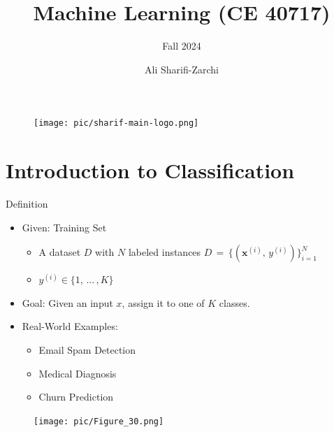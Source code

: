 \documentclass[serif, aspectratio=169]{beamer}
\author{Ali Sharifi-Zarchi}
\title{Machine Learning (CE 40717)}
\subtitle{Fall 2024}
\institute{
    CE Department \\
    Sharif University of Technology
}
\begin{document}
\begin{frame}
    \titlepage
    \vspace*{-0.6cm}
    \begin{figure}[htpb]
        \begin{center}
            \texttt{[image: pic/sharif-main-logo.png]}
        \end{center}
    \end{figure}
\end{frame}

\begin{frame}
\tableofcontents[sectionstyle=show,
subsectionstyle=show/shaded/hide,
subsubsectionstyle=show/shaded/hide]
\end{frame}

\section{Introduction to Classification}
\begin{frame}{Definition}
    \begin{itemize}\itemsep2em
        \item Given: Training Set
        \begin{itemize}
            \item A dataset \(D\) with \(N\) labeled instances \(D \, = \, \{(\mathbf{x}^{(i)}, \, y^{(i)})\}^N_{i=1}\)
            \item $y^{(i)} \in \{1, \, ... \, , K\}$
        \end{itemize}
    \end{itemize}
    \begin{itemize}
        \item \justifying Goal: Given an input $x$, assign it to one of $K$ classes.
            \item Real-World Examples:
            \begin{itemize}
                \item Email Spam Detection
                \item Medical Diagnosis
                \item Churn Prediction
            \end{itemize}
    \end{itemize}
    \endminipage
    \hfill
    \begin{figure}
            \centering
            \texttt{[image: pic/Figure\_30.png]}
        \end{figure}
    \endminipage
\end{frame}
\end{document}

